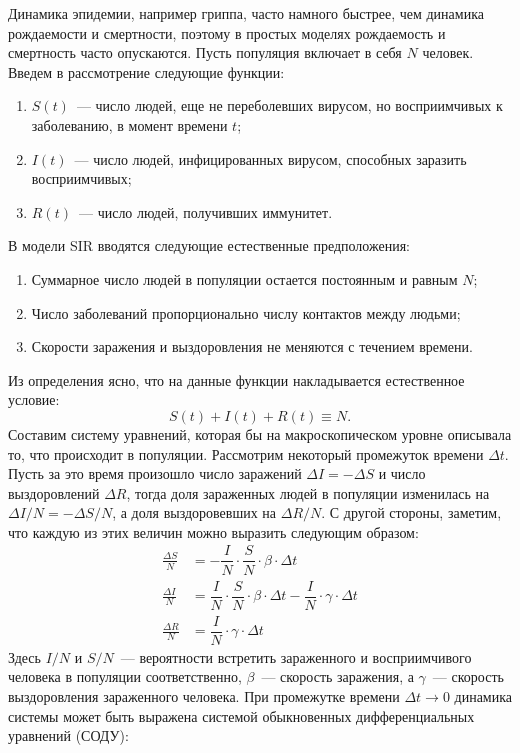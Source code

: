 \documentclass[12pt]{article}
\begin{document}
Динамика эпидемии, например гриппа, часто намного быстрее, чем динамика рождаемости и смертности, поэтому в простых моделях рождаемость и смертность часто опускаются. Пусть популяция включает в себя $N$ человек. Введем в рассмотрение следующие функции:
\begin{enumerate}
    \item $S(t)$~--- число людей, еще не переболевших вирусом, но восприимчивых к заболеванию, в момент времени $t$;
    \item $I(t)$~--- число людей, инфицированных вирусом, способных заразить восприимчивых;
    \item $R(t)$~--- число людей, получивших иммунитет.
\end{enumerate}
В модели SIR вводятся следующие естественные предположения:
\begin{enumerate}
    \item Суммарное число людей в популяции остается постоянным и равным $N$;
    \item Число заболеваний пропорционально числу контактов между людьми;
    \item Скорости заражения и выздоровления не меняются с течением времени.
\end{enumerate}
Из определения ясно, что на данные функции накладывается естественное условие:
\begin{equation}
    S(t) + I(t) + R(t) \equiv N.
\end{equation}
Составим систему уравнений, которая бы на макроскопическом уровне описывала то, что происходит в популяции. Рассмотрим некоторый промежуток времени $\Delta t$. Пусть за это время произошло число заражений $\Delta I = - \Delta S$ и число выздоровлений $\Delta R$, тогда доля зараженных людей в популяции изменилась на $\Delta I / N = - \Delta S / N$, а доля выздоровевших на $\Delta R / N$. С другой стороны, заметим, что каждую из этих величин можно выразить следующим образом:
\begin{align}
    \frac{\Delta S}{N} &= - \dfrac{I}{N} \cdot \dfrac{S}{N} \cdot \beta \cdot \Delta t \\
    \frac{\Delta I}{N} &= \dfrac{I}{N} \cdot \dfrac{S}{N} \cdot \beta \cdot \Delta t - \dfrac{I}{N} \cdot \gamma \cdot \Delta t \\
    \frac{\Delta R}{N} &= \dfrac{I}{N} \cdot \gamma \cdot \Delta t
\end{align}
Здесь $I/N$ и $S/N$~--- вероятности встретить зараженного и восприимчивого человека в популяции соответственно, $\beta$~--- скорость заражения, а $\gamma$~--- скорость выздоровления зараженного человека. При промежутке времени $\Delta t \to 0$ динамика системы может быть выражена системой обыкновенных дифференциальных уравнений (СОДУ):
\end{document}
